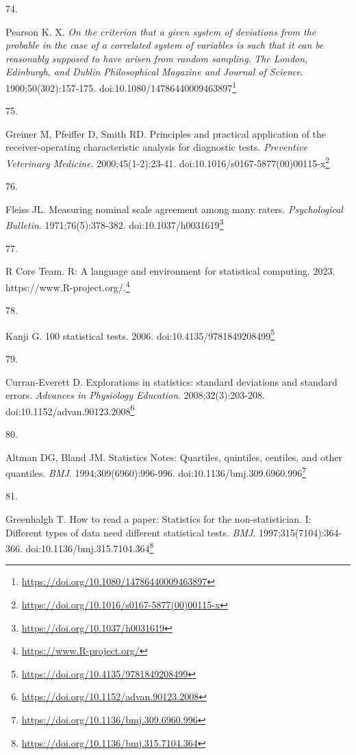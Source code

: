 \documentclass[
  a4paper,
]{book}
\newlength{\cslhangindent}
\newlength{\csllabelwidth}
\newlength{\cslentryspacingunit} %
\newenvironment{CSLReferences}[2] %
 {%
  \setlength{\parindent}{0pt}
  \ifodd #1
  \let\oldpar\par
  \def\par{\hangindent=\cslhangindent\oldpar}
  \fi
  \setlength{\parskip}{#2\cslentryspacingunit}
 }%
 {}
\newcommand{\CSLLeftMargin}[1]{\parbox[t]{\csllabelwidth}{#1}}
\newcommand{\CSLRightInline}[1]{\parbox[t]{\linewidth - \csllabelwidth}{#1}\break}
\renewcommand{\href}[2]{#2\footnote{\url{#1}}}
\begin{document}
\begin{CSLReferences}{0}{0}
\leavevmode{}%
\CSLLeftMargin{74. }%
\CSLRightInline{Pearson K. X. {\emph{On the criterion that a given system of deviations from the probable in the case of a correlated system of variables is such that it can be reasonably supposed to have arisen from random sampling}}. \emph{The London, Edinburgh, and Dublin Philosophical Magazine and Journal of Science}. 1900;50(302):157-175. doi:\href{https://doi.org/10.1080/14786440009463897}{10.1080/14786440009463897}}

\leavevmode{}%
\CSLLeftMargin{75. }%
\CSLRightInline{Greiner M, Pfeiffer D, Smith RD. Principles and practical application of the receiver-operating characteristic analysis for diagnostic tests. \emph{Preventive Veterinary Medicine}. 2000;45(1-2):23-41. doi:\href{https://doi.org/10.1016/s0167-5877(00)00115-x}{10.1016/s0167-5877(00)00115-x}}

\leavevmode{}%
\CSLLeftMargin{76. }%
\CSLRightInline{Fleiss JL. Measuring nominal scale agreement among many raters. \emph{Psychological Bulletin}. 1971;76(5):378-382. doi:\href{https://doi.org/10.1037/h0031619}{10.1037/h0031619}}

\leavevmode{}%
\CSLLeftMargin{77. }%
\CSLRightInline{R Core Team. R: A language and environment for statistical computing. 2023. \href{https://www.R-project.org/}{https://www.R-project.org/.}}

\leavevmode{}%
\CSLLeftMargin{78. }%
\CSLRightInline{Kanji G. 100 statistical tests. 2006. doi:\href{https://doi.org/10.4135/9781849208499}{10.4135/9781849208499}}

\leavevmode{}%
\CSLLeftMargin{79. }%
\CSLRightInline{Curran-Everett D. Explorations in statistics: standard deviations and standard errors. \emph{Advances in Physiology Education}. 2008;32(3):203-208. doi:\href{https://doi.org/10.1152/advan.90123.2008}{10.1152/advan.90123.2008}}

\leavevmode{}%
\CSLLeftMargin{80. }%
\CSLRightInline{Altman DG, Bland JM. Statistics Notes: Quartiles, quintiles, centiles, and other quantiles. \emph{BMJ}. 1994;309(6960):996-996. doi:\href{https://doi.org/10.1136/bmj.309.6960.996}{10.1136/bmj.309.6960.996}}

\leavevmode{}%
\CSLLeftMargin{81. }%
\CSLRightInline{Greenhalgh T. How to read a paper: Statistics for the non-statistician. I: Different types of data need different statistical tests. \emph{BMJ}. 1997;315(7104):364-366. doi:\href{https://doi.org/10.1136/bmj.315.7104.364}{10.1136/bmj.315.7104.364}}


\end{CSLReferences}
\end{document}
